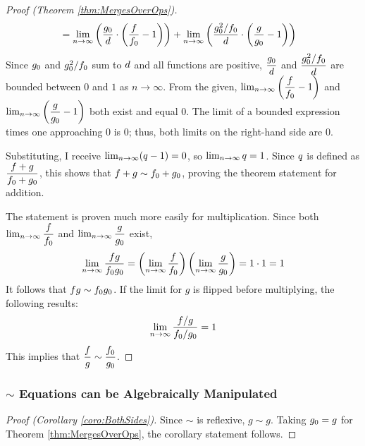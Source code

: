 \begin{proof}[Proof (Theorem \ref{thm:MergesOverOps})]
\begin{align*}
	&= \lim_{n \to \infty} \left( \frac{g_0}{d} \cdot \left( \frac{f}{f_0} - 1 \right) \right) + \lim_{n \to \infty} \left( \frac{g_0^2 / f_0}{d} \cdot \left( \frac{g}{g_0} - 1 \right) \right)
	\end{align*}
	Since $g_0$ and $g_0^2 / f_0$ sum to $d$ and all functions are positive, $\dfrac{g_0}{d}$ and $\dfrac{g_0^2 / f_0}{d}$ are bounded between $0$ and $1$ as $n \to \infty$. From the given, $\lim_{n \to \infty} \left( \dfrac{f}{f_0} - 1 \right)$ and $\lim_{n \to \infty} \left( \dfrac{g}{g_0} - 1 \right)$ both exist and equal $0$. The limit of a bounded expression times one approaching $0$ is $0$; thus, both limits on the right-hand side are $0$.
	
	Substituting, I receive $\lim_{n \to \infty} (q - 1) = 0$, so $\lim_{n \to \infty} q = 1$. Since $q$ is defined as $\dfrac{f + g}{f_0 + g_0}$, this shows that $f + g \sim f_0 + g_0$, proving the theorem statement for addition.
	
	The statement is proven much more easily for multiplication. Since both $\lim_{n \to \infty} \dfrac{f}{f_0}$ and $\lim_{n \to \infty} \dfrac{g}{g_0}$ exist,
	\begin{align*}
	\lim_{n \to \infty} \frac{fg}{f_0g_0} = \left( \lim_{n \to \infty} \frac{f}{f_0} \right) \left( \lim_{n \to \infty} \frac{g}{g_0} \right) = 1 \cdot 1 = 1
	\end{align*}
	It follows that $fg \sim f_0g_0$. If the limit for $g$ is flipped before multiplying, the following results:
	\begin{align*}
	\lim_{n \to \infty} \frac{f / g}{f_0 / g_0} = 1
	\end{align*}
	This implies that $\dfrac f g \sim \dfrac {f_0} {g_0}$.
\end{proof}

\subsubsection{$\sim$ Equations can be Algebraically Manipulated}

\begin{proof}[Proof (Corollary \ref{coro:BothSides})]
	Since $\sim$ is reflexive, $g \sim g$. Taking $g_0 = g$ for Theorem \ref{thm:MergesOverOps}, the corollary statement follows.
\end{proof}

